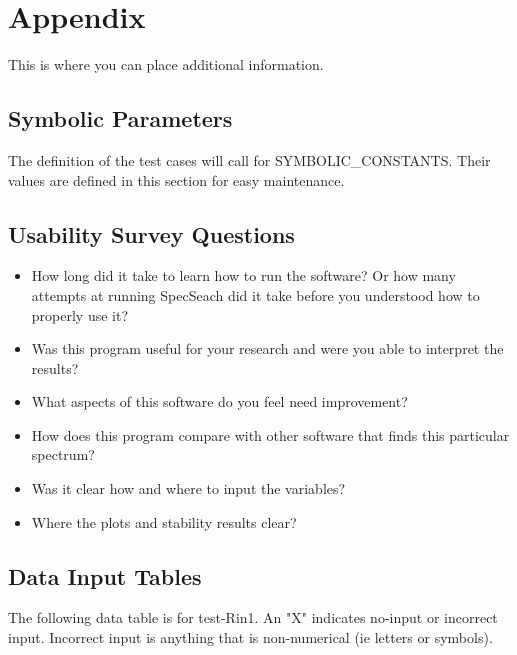 \documentclass[12pt, titlepage]{article}
\begin{document}

\newpage

\section{Appendix}

This is where you can place additional information.

\subsection{Symbolic Parameters}

The definition of the test cases will call for SYMBOLIC\_CONSTANTS.
Their values are defined in this section for easy maintenance.

\subsection{Usability Survey Questions}

\begin{itemize}
	\item How long did it take to learn how to run the software? Or how many 
	attempts at running SpecSeach did it take before you understood how to 
	properly use it?
	\item Was this program useful for your research and were you able to 
	interpret the results? 
	\item What aspects of this software do you feel need improvement?
	\item How does this program compare with other software that finds this 
	particular spectrum? 
	\item Was it clear how and where to input the variables? 
	\item Where the plots and stability results clear? 
\end{itemize} 

\newpage
\subsection{Data Input Tables} 

The following data table is for test-Rin1. An "X" indicates no-input or 
incorrect input. Incorrect input is anything that is non-numerical (ie letters 
or symbols). 
\end{document}
